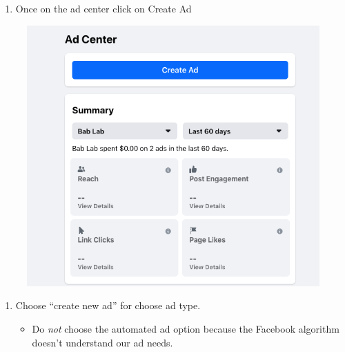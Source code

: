 \documentclass[]{book}
\providecommand{\tightlist}{%
  \setlength{\itemsep}{0pt}\setlength{\parskip}{0pt}}
\begin{document}
\begin{enumerate}
\def\labelenumi{\arabic{enumi}.}
\setcounter{enumi}{1}
\tightlist
\item
  Once on the ad center click on Create Ad
\end{enumerate}

\begin{figure}
\centering
\includegraphics{images/lab_protocols/fb_ads/2.png}
\caption{}
\end{figure}

\begin{enumerate}
\def\labelenumi{\arabic{enumi}.}
\setcounter{enumi}{2}
\item
  Choose ``create new ad'' for choose ad type.

  \begin{itemize}
  \tightlist
  \item
    Do \emph{not} choose the automated ad option because the Facebook algorithm doesn't understand our ad needs.
  \end{itemize}
\end{enumerate}
\end{document}
